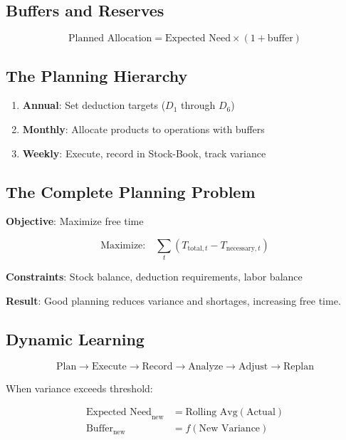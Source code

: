 \documentclass[12pt,a4paper]{article}
\begin{document}
\subsection{Buffers and Reserves}

\begin{equation}
\text{Planned Allocation} = \text{Expected Need} \times (1 + \text{buffer})
\end{equation}

\subsection{The Planning Hierarchy}

\begin{enumerate}
\item \textbf{Annual}: Set deduction targets ($D_1$ through $D_6$)
\item \textbf{Monthly}: Allocate products to operations with buffers
\item \textbf{Weekly}: Execute, record in Stock-Book, track variance
\end{enumerate}

\subsection{The Complete Planning Problem}

\textbf{Objective}: Maximize free time

\begin{equation}
\text{Maximize:} \quad \sum_t \left( T_{\text{total},t} - T_{\text{necessary},t} \right)
\end{equation}

\textbf{Constraints}: Stock balance, deduction requirements, labor balance

\textbf{Result}: Good planning reduces variance and shortages, increasing free time.

\subsection{Dynamic Learning}

\begin{equation}
\text{Plan} \rightarrow \text{Execute} \rightarrow \text{Record} \rightarrow \text{Analyze} \rightarrow \text{Adjust} \rightarrow \text{Replan}
\end{equation}

When variance exceeds threshold:

\begin{align}
\text{Expected Need}_{\text{new}} &= \text{Rolling Avg}(\text{Actual}) \\
\text{Buffer}_{\text{new}} &= f(\text{New Variance})
\end{align}
\end{document}
